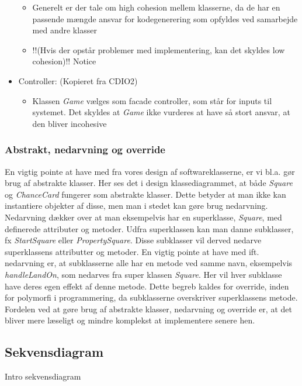 \documentclass[../main.tex]{subfiles}
\begin{document}
\begin{flushleft}
\begin{itemize}
\begin{itemize}
        \item Generelt er der tale om high cohesion mellem klasserne, da de har en passende mængde ansvar for kodegenerering som opfyldes ved samarbejde med andre klasser
        \item \TODO !!(Hvis der opstår problemer med implementering, kan det skyldes low cohesion)!! Notice
    \end{itemize}
    \item Controller: (Kopieret fra CDIO2)
    \begin{itemize}
        \item Klassen \textit{Game} vælges som facade controller, som står for inputs til systemet. Det skyldes at \textit{Game} ikke vurderes at have så stort ansvar, at den bliver incohesive
    \end{itemize}
\end{itemize}

\subsubsection{Abstrakt, nedarvning og override}
En vigtig pointe at have med fra vores design af softwareklasserne, er vi bl.a. gør brug af abstrakte klasser. Her ses det i design klassediagrammet, at både \textit{Square} og \textit{ChanceCard} fungerer som abstrakte klasser. Dette betyder at man ikke kan instantiere objekter af disse, men man i stedet kan gøre brug nedarvning. Nedarvning dækker over at man eksempelvis har en superklasse, \textit{Square}, med definerede attributer og metoder. Udfra superklassen kan man danne subklasser, fx \textit{StartSquare} eller \textit{PropertySquare}. Disse subklasser vil derved nedarve superklassens attributter og metoder. En vigtig pointe at have med ift. nedarvning er, at subklasserne alle har en metode ved samme navn, eksempelvis \textit{handleLandOn}, som nedarves fra super klassen \textit{Square}. Her vil hver subklasse have deres egen effekt af denne metode. Dette begreb kaldes for override, inden for polymorfi i programmering, da subklasserne overskriver superklassens metode. Fordelen ved at gøre brug af abstrakte klasser, nedarvning og override er, at det bliver mere læseligt og mindre komplekst at implementere senere hen.

\subsection{Sekvensdiagram }

\TODO Intro sekvensdiagram



\end{flushleft}
\end{document}
